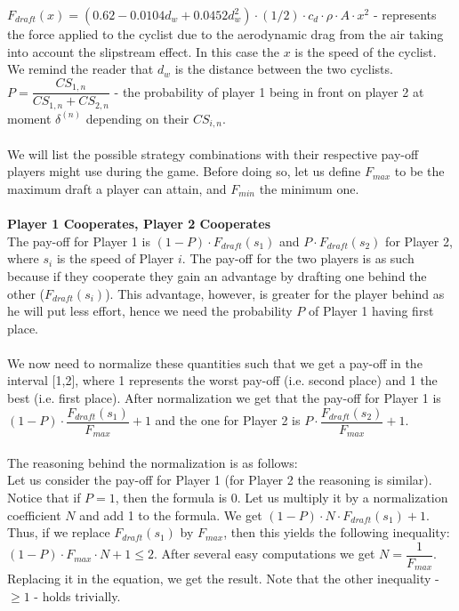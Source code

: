 \documentclass[10pt, a4paper]{report}
\begin{document}
$F_{draft}(x)=(0.62 - 0.0104d_w + 0.0452 d_w^2)\cdot (1/2)\cdot c_d\cdot \rho\cdot A\cdot x^2$ -  represents the force applied to the cyclist due to the aerodynamic drag from the air taking into account the slipstream effect. In this case the $x$ is the speed of the cyclist. We remind the reader that $d_w$ is the distance between the two cyclists.
$P = \dfrac{CS_{1,n}}{CS_{1,n}+CS_{2,n}}$ - the probability of player 1 being in front on player 2 at moment $\delta^{(n)}$ depending on their $CS_{i,n}$.
\\\\
We will list the possible strategy combinations with their respective pay-off players might use during the game. Before doing so, let us define $F_{max}$ to be the maximum draft a player can attain, and $F_{min}$ the minimum one.
\\\\
\textbf{Player 1 Cooperates, Player 2 Cooperates}
\\
The pay-off for Player 1 is $(1-P)\cdot F_{draft}(s_1)$ and $P \cdot F_{draft}(s_2)$ for Player 2, where $s_i$ is the speed of Player $i$. The pay-off for the two players is as such because if they cooperate they gain an advantage by drafting one behind the other ($F_{draft}(s_i)$). This advantage, however, is greater for the player behind as he will put less effort, hence we need the probability $P$ of Player 1 having first place.
\\\\
We now need to normalize these quantities such that we get a pay-off in the interval [1,2], where 1 represents the worst pay-off (i.e. second place) and 1 the best (i.e. first place). After normalization we get that the pay-off for Player 1 is $(1-P)\cdot \dfrac{F_{draft}(s_1)}{F_{max}} + 1$ and the one for Player 2 is $P\cdot \dfrac{F_{draft}(s_2)}{F_{max}} + 1$.
\\\\
The reasoning behind the normalization is as follows:\\
Let us consider the pay-off for Player 1 (for Player 2 the reasoning is similar). Notice that if $P=1$, then the formula is 0. Let us multiply it by a normalization coefficient $N$ and add 1 to the formula. We get $(1-P)\cdot N\cdot F_{draft}(s_1)  + 1$. Thus, if we replace $F_{draft}(s_1)$ by $F_{max}$, then this yields the following inequality: $(1-P)\cdot F_{max} \cdot N + 1\le 2$. After several easy computations we get $N = \dfrac{1}{F_{max}}$. Replacing it in the equation, we get the result. Note that the other inequality - $\ge 1$ - holds trivially.
\end{document}
